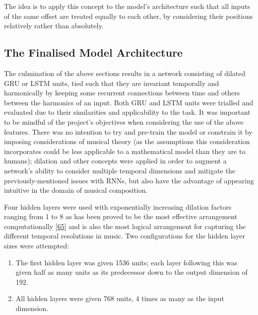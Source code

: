 \documentclass[12pt,]{article}
\providecommand{\tightlist}{%
  \setlength{\itemsep}{0pt}\setlength{\parskip}{0pt}}
\begin{document}
The idea is to apply this concept to the model's architecture such that
all inputs of the same offset are treated equally to each other, by
considering their positions relatively rather than absolutely.

\hypertarget{the-finalised-model-architecture}{%
\subsection{The Finalised Model
Architecture}\label{the-finalised-model-architecture}}

The culmination of the above sections results in a network consisting of
dilated GRU or LSTM units, tied such that they are invariant temporally
and harmonically by keeping some recurrent connections between time and
others between the harmonics of an input. Both GRU and LSTM units were
trialled and evaluated due to their similarities and applicability to
the task. It was important to be mindful of the project's objectives
when considering the use of the above features. There was no intention
to try and pre-train the model or constrain it by imposing
considerations of musical theory (as the assumptions this consideration
incorporates could be less applicable to a mathematical model than they
are to humans); dilation and other concepts were applied in order to
augment a network's ability to consider multiple temporal dimensions and
mitigate the previously-mentioned issues with RNNs, but also have the
advantage of appearing intuitive in the domain of musical composition.

Four hidden layers were used with exponentially increasing dilation
factors ranging from 1 to 8 as has been proved to be the most effective
arrangement computationally
{[}\protect\hyperlink{ref-chang2017dilated}{65}{]} and is also the most
logical arrangement for capturing the different temporal resolutions in
music. Two configurations for the hidden layer sizes were attempted:

\begin{enumerate}
\def\labelenumi{\arabic{enumi}.}
\tightlist
\item
  The first hidden layer was given 1536 units; each layer following this
  was given half as many units as its predecessor down to the output
  dimension of 192.
\item
  All hidden layers were given 768 units, 4 times as many as the input
  dimension.
\end{enumerate}
\end{document}
